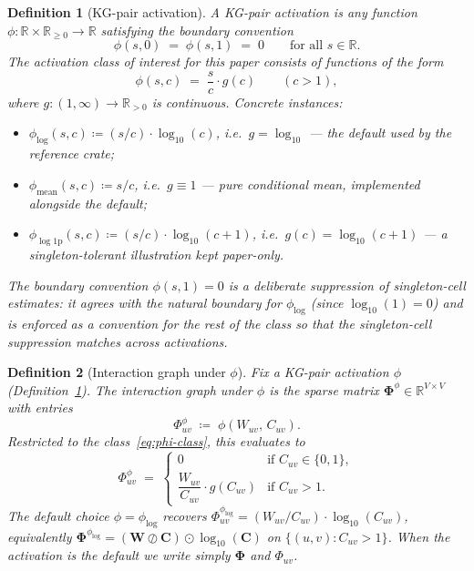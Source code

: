 \documentclass[11pt]{article}
\newtheorem{definition}{Definition}
\begin{document}
\begin{definition}[KG-pair activation]
\label{def:kg-activation}
A \emph{KG-pair activation} is any function $\phi : \mathbb{R} \times \mathbb{R}_{\ge 0} \to \mathbb{R}$ satisfying the boundary convention
\[
  \phi(s, 0) \;=\; \phi(s, 1) \;=\; 0 \qquad \text{for all } s \in \mathbb{R}.
\]
The \emph{activation class of interest} for this paper consists of functions of the form
\begin{equation}
  \phi(s, c) \;=\; \frac{s}{c} \cdot g(c) \qquad (c > 1),
  \label{eq:phi-class}
\end{equation}
where $g : (1, \infty) \to \mathbb{R}_{> 0}$ is continuous. Concrete instances:
\begin{itemize}
  \item $\phi_{\log}(s, c) \coloneqq (s/c) \cdot \log_{10}(c)$, i.e.\ $g = \log_{10}$ --- the \emph{default} used by the reference crate;
  \item $\phi_{\mathrm{mean}}(s, c) \coloneqq s/c$, i.e.\ $g \equiv 1$ --- pure conditional mean, implemented alongside the default;
  \item $\phi_{\log\!1\mathrm{p}}(s, c) \coloneqq (s/c) \cdot \log_{10}(c + 1)$, i.e.\ $g(c) = \log_{10}(c+1)$ --- a singleton-tolerant illustration kept paper-only.
\end{itemize}
The boundary convention $\phi(s, 1) = 0$ is a deliberate suppression of singleton-cell estimates: it agrees with the natural boundary for $\phi_{\log}$ (since $\log_{10}(1) = 0$) and is enforced as a convention for the rest of the class so that the singleton-cell suppression matches across activations.
\end{definition}

\begin{definition}[Interaction graph under $\phi$]
\label{def:graph}
Fix a KG-pair activation $\phi$ (Definition~\ref{def:kg-activation}).
The \emph{interaction graph under $\phi$} is the sparse matrix $\bm{\Phi}^\phi \in \mathbb{R}^{V \times V}$ with entries
\begin{equation}
  \Phi^\phi_{uv} \;\coloneqq\; \phi(W_{uv},\, C_{uv}).
  \label{eq:Phi}
\end{equation}
Restricted to the class~\eqref{eq:phi-class}, this evaluates to
\[
  \Phi^\phi_{uv} \;=\;
  \begin{cases}
    0 & \text{if } C_{uv} \in \{0, 1\}, \\[6pt]
    \dfrac{W_{uv}}{C_{uv}} \cdot g(C_{uv}) & \text{if } C_{uv} > 1.
  \end{cases}
\]
The default choice $\phi = \phi_{\log}$ recovers $\Phi^{\phi_{\log}}_{uv} = (W_{uv}/C_{uv})\cdot\log_{10}(C_{uv})$, equivalently $\bm{\Phi}^{\phi_{\log}} = (\bm{W} \oslash \bm{C}) \odot \log_{10}(\bm{C})$ on $\{(u,v) : C_{uv} > 1\}$. When the activation is the default we write simply $\bm{\Phi}$ and $\Phi_{uv}$.
\end{definition}
\end{document}
